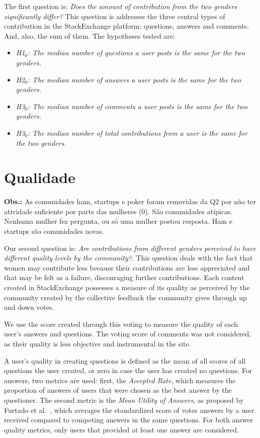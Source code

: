 The first question is: \textit{Does the amount of contribution from the two genders significantly differ?}
This question is addresses the three central types of contribution in the StackExchange platform: questions, answers and comments. And, also, the sum of them. The hypotheses tested are:
    
\begin{itemize}
    \item \textit{H1$_0$: The median number of questions a user posts is the same for the two genders.}
    \item \textit{H2$_0$: The median number of answers a user posts is the same for the two genders.}
    \item \textit{H3$_0$: The median number of comments a user posts is the same for the two genders.}
    \item \textit{H3$_0$: The median number of total contributions from a user is the same for the two genders.}
\end{itemize}


\section{Qualidade} %
\label{sub:qualidade}

\textbf{Obs.:} As comunidades ham, startups e poker foram removidas da Q2 por não ter atividade suficiente por parte das mulheres (0). São comunidades atípicas. Nenhuma mulher fez pergunta, ou só uma mulher postou resposta. Ham e startups são comunidades novas.

Our second question is: \textit{Are contributions from different genders perceived to have different quality levels by the community?}. This question deals with the fact that women may contribute less because their contributions are less appreciated and that may be felt as a failure, discouraging further contributions. 
Each content created in StackExchange possesses a measure of its quality as perceived by the community created by the collective feedback the community gives through up and down votes. 

We use the score created through this voting to measure the quality of each user's answers and questions. The voting score of comments was not considered, as their quality is less objective and instrumental in the site. 

A user's quality in creating questions is defined as the mean of all scores of all questions the user created, or zero in case the user has created no questions. For answers, two metrics are used: first, the \emph{Accepted Rate}, which measures the proportion of answers of users that were chosen as the best answer by the questioner. The second metric is the  \emph{Mean Utility of Answers}, as proposed by Furtado et al.~\cite{furtado2013contributor}, which averages the standardized score of votes answers by a user received compared to competing answers in the same questions. For both answer quality metrics, only users that provided at least one answer are considered.

